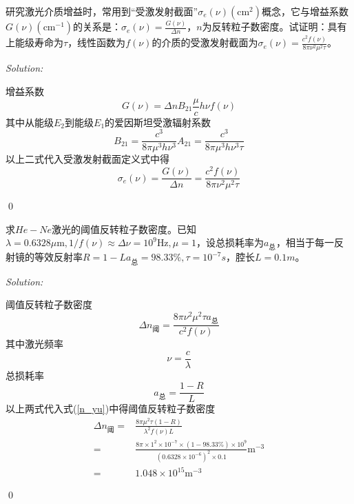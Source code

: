 \documentclass[12pt,a4paper]{article}
\newenvironment{problem}[2][Problem]{\begin{trivlist}
\item[\hskip \labelsep {\bfseries #1}\hskip \labelsep {\bfseries #2.}]}{\end{trivlist}}
\newenvironment{sol}
    {\emph{Solution:}
    }
    {
    \qed
    }
\begin{document}
\begin{problem}{2.8}
研究激光介质增益时，常用到“受激发射截面”$\sigma_e(\nu)(\text{cm}^2)$概念，它与增益系数$G(\nu)(\text{cm}^{-1})$的关系是：$\sigma_e(\nu)=\frac{G(\nu)}{\Delta n}$，$n$为反转粒子数密度。试证明：具有上能级寿命为$\tau$，线性函数为$f(\nu)$的介质的受激发射截面为$\sigma_e(\nu)=\frac{c^2f(\nu)}{8\pi\nu^2\mu^2\tau}$。
\end{problem}
\begin{sol}
增益系数
\begin{equation}
G(\nu)=\Delta nB_{21}\frac{\mu}{c}h\nu f(\nu)
\end{equation}
其中从能级$E_2$到能级$E_1$的爱因斯坦受激辐射系数
\begin{equation}
B_{21}=\frac{c^3}{8\pi\mu^3h\nu^3}A_{21}=\frac{c^3}{8\pi\mu^3h\nu^3\tau}
\end{equation}
以上二式代入受激发射截面定义式中得
\begin{equation}
\sigma_e(\nu)=\frac{G(\nu)}{\Delta n}=\frac{c^2f(\nu)}{8\pi\nu^2\mu^2\tau}
\end{equation}
\end{sol}

\begin{problem}{2.11}
求$He-Ne$激光的阈值反转粒子数密度。已知$\lambda=0.6328\mu\text{m},1/f(\nu)\approx\Delta\nu=10^9\text{Hz},\mu=1$，设总损耗率为$a_{\text{总}}$，相当于每一反射镜的等效反射率$R=1-La_{\text{总}}=98.33\%,\tau=10^{-7}s$，腔长$L=0.1m$。
\end{problem}
\begin{sol}
阈值反转粒子数密度
\begin{equation}
\label{n_yu}
\Delta n_{\text{阈}}=\frac{8\pi\nu^2\mu^2\tau a_{\text{总}}}{c^2f(\nu)}
\end{equation}
其中激光频率
\begin{equation}
\nu=\frac{c}{\lambda}
\end{equation}
总损耗率
\begin{equation}
a_{\text{总}}=\frac{1-R}{L}
\end{equation}
以上两式代入式(\ref{n_yu})中得阈值反转粒子数密度
\begin{align}
\nonumber\Delta n_{\text{阈}}=&\frac{8\pi\mu^2\tau(1-R)}{\lambda^2f(\nu)L}\\
\nonumber=&\frac{8\pi\times1^2\times10^{-7}\times(1-98.33\%)\times10^9}{(0.6328\times10^{-6})^2\times0.1}\text{m}^{-3}\\
=&1.048\times10^{15}\text{m}^{-3}
\end{align}
\end{sol}
\end{document}
